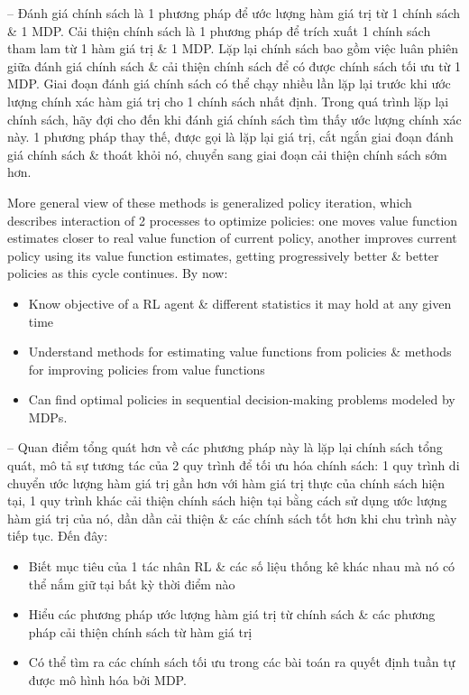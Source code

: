\documentclass{article}
\begin{document}
\begin{itemize}
\begin{itemize}
        -- Đánh giá chính sách là 1 phương pháp để ước lượng hàm giá trị từ 1 chính sách \& 1 MDP. Cải thiện chính sách là 1 phương pháp để trích xuất 1 chính sách tham lam từ 1 hàm giá trị \& 1 MDP. Lặp lại chính sách bao gồm việc luân phiên giữa đánh giá chính sách \& cải thiện chính sách để có được chính sách tối ưu từ 1 MDP. Giai đoạn đánh giá chính sách có thể chạy nhiều lần lặp lại trước khi ước lượng chính xác hàm giá trị cho 1 chính sách nhất định. Trong quá trình lặp lại chính sách, hãy đợi cho đến khi đánh giá chính sách tìm thấy ước lượng chính xác này. 1 phương pháp thay thế, được gọi là lặp lại giá trị, cắt ngắn giai đoạn đánh giá chính sách \& thoát khỏi nó, chuyển sang giai đoạn cải thiện chính sách sớm hơn.

        More general view of these methods is generalized policy iteration, which describes interaction of 2 processes to optimize policies: one moves value function estimates closer to real value function of current policy, another improves current policy using its value function estimates, getting progressively better \& better policies as this cycle continues. By now:
        \begin{itemize}
            \item Know objective of a RL agent \& different statistics it may hold at any given time
            \item Understand methods for estimating value functions from policies \& methods for improving policies from value functions
            \item Can find optimal policies in sequential decision-making problems modeled by MDPs.
        \end{itemize}
        -- Quan điểm tổng quát hơn về các phương pháp này là lặp lại chính sách tổng quát, mô tả sự tương tác của 2 quy trình để tối ưu hóa chính sách: 1 quy trình di chuyển ước lượng hàm giá trị gần hơn với hàm giá trị thực của chính sách hiện tại, 1 quy trình khác cải thiện chính sách hiện tại bằng cách sử dụng ước lượng hàm giá trị của nó, dần dần cải thiện \& các chính sách tốt hơn khi chu trình này tiếp tục. Đến đây:
        \begin{itemize}
            \item Biết mục tiêu của 1 tác nhân RL \& các số liệu thống kê khác nhau mà nó có thể nắm giữ tại bất kỳ thời điểm nào
            \item Hiểu các phương pháp ước lượng hàm giá trị từ chính sách \& các phương pháp cải thiện chính sách từ hàm giá trị
            \item Có thể tìm ra các chính sách tối ưu trong các bài toán ra quyết định tuần tự được mô hình hóa bởi MDP.

\end{itemize}
\end{itemize}
\end{itemize}
\end{document}
